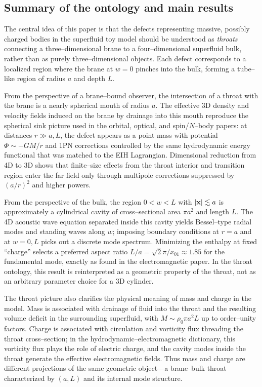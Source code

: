\documentclass[12pt]{article}
\begin{document}
\subsection{Summary of the ontology and main results}
\label{subsec:summary}

The central idea of this paper is that the defects representing massive,
possibly charged bodies in the superfluid toy model should be understood as
\emph{throats} connecting a three--dimensional brane to a four--dimensional
superfluid bulk, rather than as purely three--dimensional objects.  Each
defect corresponds to a localized region where the brane at $w=0$ pinches
into the bulk, forming a tube--like region of radius $a$ and depth $L$.

From the perspective of a brane--bound observer, the intersection of a
throat with the brane is a nearly spherical mouth of radius $a$.  The
effective 3D density and velocity fields induced on the brane by drainage
into this mouth reproduce the spherical sink picture used in the orbital,
optical, and spin/$N$--body papers: at distances $r\gg a,L$, the defect
appears as a point mass with potential $\Phi\sim -GM/r$ and 1PN corrections
controlled by the same hydrodynamic energy functional that was matched to
the EIH Lagrangian.  Dimensional reduction from 4D to 3D shows that
finite--size effects from the throat interior and transition region enter
the far field only through multipole corrections suppressed by $(a/r)^2$ and
higher powers.

From the perspective of the bulk, the region $0<w<L$ with
$\abs{\mathbf{x}}\lesssim a$ is approximately a cylindrical cavity of
cross--sectional area $\pi a^2$ and length $L$.  The 4D acoustic wave
equation separated inside this cavity yields Bessel--type radial modes and
standing waves along $w$; imposing boundary conditions at $r=a$ and at
$w=0,L$ picks out a discrete mode spectrum.  Minimizing the enthalpy at
fixed ``charge'' selects a preferred aspect ratio
$L/a = \sqrt{2}\pi/x_{01} \approx 1.85$ for the fundamental mode, exactly as
found in the electromagnetic paper.  In the throat ontology, this result is
reinterpreted as a geometric property of the throat, not as an arbitrary
parameter choice for a 3D cylinder.

The throat picture also clarifies the physical meaning of mass and charge in
the model.  Mass is associated with drainage of fluid into the throat and
the resulting volume deficit in the surrounding superfluid, with
$M\sim\rho_0\pi a^2L$ up to order--unity factors.  Charge is associated with
circulation and vorticity flux threading the throat cross--section; in the
hydrodynamic--electromagnetic dictionary, this vorticity flux plays the role
of electric charge, and the cavity modes inside the throat generate the
effective electromagnetic fields.  Thus mass and charge are different
projections of the same geometric object---a brane--bulk throat characterized by $(a,L)$ and its internal mode structure.
\end{document}
